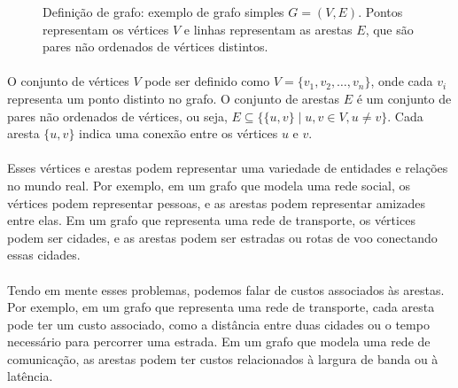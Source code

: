 \documentclass[12pt,a4paper]{article}
\def\\{}%
\begin{document}
\begin{figure}[H]
\centering
{}
\caption{Definição de grafo: exemplo de grafo simples \(G=(V,E)\). Pontos representam os vértices \(V\) e linhas representam as arestas \(E\), que são pares não ordenados de vértices distintos.}
\label{fig:def-grafo}
\end{figure}

\paragraph{}
O conjunto de vértices \(V\) pode ser definido como \(V = \{v_1, v_2, \ldots, v_n\}\), onde cada \(v_i\) representa um ponto distinto no grafo. O conjunto de arestas \(E\) é um conjunto de pares não ordenados de vértices, ou seja, \(E \subseteq \{\{u, v\} \mid u, v \in V, u \neq v\}\). Cada aresta \(\{u, v\}\) indica uma conexão entre os vértices \(u\) e \(v\).

\paragraph{}
Esses vértices e arestas podem representar uma variedade de entidades e relações no mundo real. Por exemplo, em um grafo que modela uma rede social, os vértices podem representar pessoas, e as arestas podem representar amizades entre elas. Em um grafo que representa uma rede de transporte, os vértices podem ser cidades, e as arestas podem ser estradas ou rotas de voo conectando essas cidades.

\paragraph{}
Tendo em mente esses problemas, podemos falar de custos associados às arestas. Por exemplo, em um grafo que representa uma rede de transporte, cada aresta pode ter um custo associado, como a distância entre duas cidades ou o tempo necessário para percorrer uma estrada. Em um grafo que modela uma rede de comunicação, as arestas podem ter custos relacionados à largura de banda ou à latência.
\end{document}
